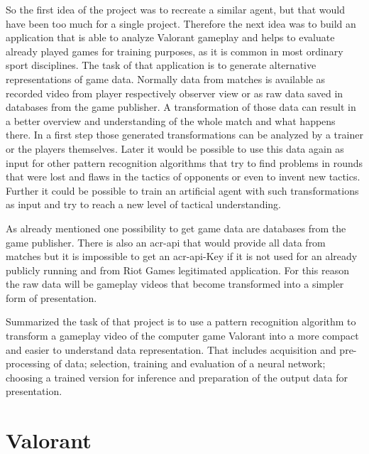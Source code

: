 So the first idea of the project was to recreate a similar agent, but that would have been too much 
for a single project. Therefore the next idea was to build an application that is able to 
analyze Valorant gameplay and helps to evaluate already played games for training purposes, as it is 
common in most ordinary sport disciplines. The task of that application is to generate alternative 
representations of game data. Normally data from matches is available as recorded video from 
player respectively observer view or as raw data saved in databases from the game publisher. A 
transformation of those data can result in a better overview and understanding of the whole match 
and what happens there. In a first step those generated transformations can be analyzed by a trainer 
or the players themselves. Later it would be possible to use this data again as input for other pattern 
recognition algorithms that try to find problems in rounds that were lost and flaws in the tactics of 
opponents or even to invent new tactics. Further it could be possible to train an artificial agent with 
such transformations as input and try to reach a new level of tactical understanding.

As already mentioned one possibility to get game data are databases from the game publisher. 
There is also an \gls{acr-api} that would provide all data from matches but it is impossible to get an 
\gls{acr-api}-Key if it is not used for an already publicly running and from Riot Games legitimated 
application. For this reason the raw data will be gameplay videos that become transformed into a 
simpler form of presentation.

Summarized the task of that project is to use a pattern recognition algorithm to transform a 
gameplay video of the computer game Valorant into a more compact and easier to understand data 
representation. That includes acquisition and pre-processing of data; selection, training and 
evaluation of a neural network; choosing a trained version for inference and preparation of the 
output data for presentation.

\section{Valorant}\label{sec:intro:valorant}

